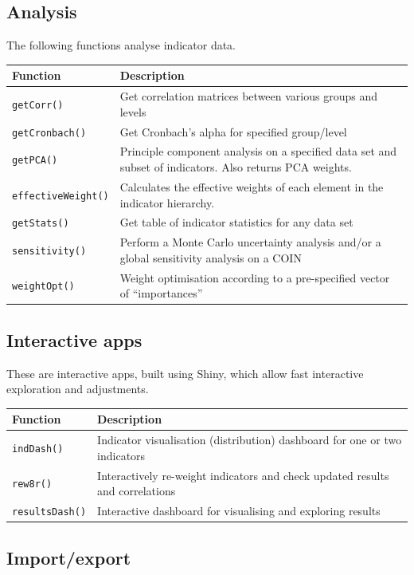 \documentclass[
]{book}
\begin{document}
\hypertarget{analysis}{%
\subsection{Analysis}\label{analysis}}

The following functions analyse indicator data.

\begin{longtable}[]{@{}ll@{}}
\toprule
Function & Description\tabularnewline
\midrule
\endhead
\texttt{getCorr()} & Get correlation matrices between various groups and levels\tabularnewline
\texttt{getCronbach()} & Get Cronbach's alpha for specified group/level\tabularnewline
\texttt{getPCA()} & Principle component analysis on a specified data set and subset of indicators. Also returns PCA weights.\tabularnewline
\texttt{effectiveWeight()} & Calculates the effective weights of each element in the indicator hierarchy.\tabularnewline
\texttt{getStats()} & Get table of indicator statistics for any data set\tabularnewline
\texttt{sensitivity()} & Perform a Monte Carlo uncertainty analysis and/or a global sensitivity analysis on a COIN\tabularnewline
\texttt{weightOpt()} & Weight optimisation according to a pre-specified vector of ``importances''\tabularnewline
\bottomrule
\end{longtable}

\hypertarget{interactive-apps}{%
\subsection{Interactive apps}\label{interactive-apps}}

These are interactive apps, built using Shiny, which allow fast interactive exploration and adjustments.

\begin{longtable}[]{@{}ll@{}}
\toprule
Function & Description\tabularnewline
\midrule
\endhead
\texttt{indDash()} & Indicator visualisation (distribution) dashboard for one or two indicators\tabularnewline
\texttt{rew8r()} & Interactively re-weight indicators and check updated results and correlations\tabularnewline
\texttt{resultsDash()} & Interactive dashboard for visualising and exploring results\tabularnewline
\bottomrule
\end{longtable}

\hypertarget{importexport}{%
\subsection{Import/export}\label{importexport}}
\end{document}
